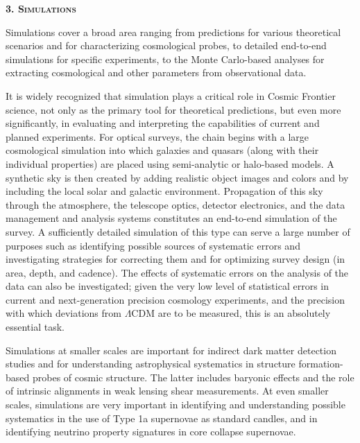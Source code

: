 \begin{center}
{\bf\scshape{3. Simulations}}
\end{center}

Simulations cover a broad area ranging from predictions for various
theoretical scenarios and for characterizing cosmological probes, to
detailed end-to-end simulations for specific experiments, to the Monte
Carlo-based analyses for extracting cosmological and other parameters
from observational data.

\medskip


It is widely recognized that simulation plays a critical role in
Cosmic Frontier science, not only as the primary tool for theoretical
predictions, but even more significantly, in evaluating and
interpreting the capabilities of current and planned experiments. For
optical surveys, the chain begins with a large cosmological simulation
into which galaxies and quasars (along with their individual
properties) are placed using semi-analytic or halo-based models. A
synthetic sky is then created by adding realistic object images and
colors and by including the local solar and galactic
environment. Propagation of this sky through the atmosphere, the
telescope optics, detector electronics, and the data management and
analysis systems constitutes an end-to-end simulation of the survey. A
sufficiently detailed simulation of this type can serve a large number
of purposes such as identifying possible sources of systematic errors
and investigating strategies for correcting them and for optimizing
survey design (in area, depth, and cadence). The effects of systematic
errors on the analysis of the data can also be investigated; given the
very low level of statistical errors in current and next-generation
precision cosmology experiments, and the precision with which
deviations from $\Lambda$CDM are to be measured, this is an absolutely
essential task.

Simulations at smaller scales are important for indirect dark matter
detection studies and for understanding astrophysical systematics in
structure formation-based probes of cosmic structure. The latter
includes baryonic effects and the role of intrinsic alignments in weak
lensing shear measurements. At even smaller scales, simulations are
very important in identifying and understanding possible systematics
in the use of Type 1a supernovae as standard candles, and in
identifying neutrino property signatures in core collapse supernovae.

